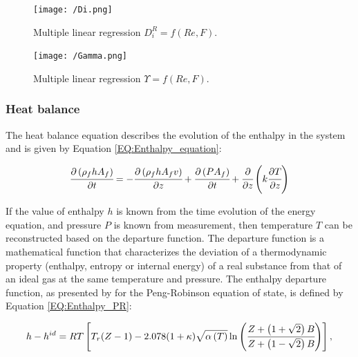 \documentclass[a4paper,fleqn]{cas-dc}
\begin{document}
	\begin{figure}[!ht]
		\centering
		\texttt{[image: /Di.png]}
		\caption{Multiple linear regression $D_i^R = f(Re, F).$}
		\label{fig:Correlation_Di}
	\end{figure}
	
	\begin{figure}[!ht]
		\centering
		\texttt{[image: /Gamma.png]}
		\caption{Multiple linear regression $\Upsilon = f(Re, F).$}
		\label{fig:Correlation_Gamma}
	\end{figure}
	
	\subsubsection{Heat balance} \label{CH: heat_balance}
	
	The heat balance equation describes the evolution of the enthalpy in the system and is given by Equation \ref{EQ:Enthalpy_equation}:
	
	{\footnotesize
		\begin{equation} \label{EQ:Enthalpy_equation}
			\cfrac{\partial \left(\rho_f {\color{black}h} A_f\right)}{\partial t} = - \cfrac{\partial \left( \rho_f {\color{black}h} A_f v \right)}{\partial z} + \cfrac{\partial \left(P A_f\right)}{\partial t} + \cfrac{\partial}{\partial z} \left( k \cfrac{\partial T}{\partial z} \right)
		\end{equation}
	}
	
	If the value of enthalpy $h$ is known from the time evolution of the energy equation, and pressure $P$ is known from measurement, then temperature $T$ can be reconstructed based on the departure function. The departure function is a mathematical function that characterizes the deviation of a thermodynamic property (enthalpy, entropy or internal energy) of a real substance from that of an ideal gas at the same temperature and pressure. The enthalpy departure function, as presented by \citet{Gmehling2019} for the Peng-Robinson equation of state,  is defined by Equation \ref{EQ:Enthalpy_PR}:
	
	{\scriptsize
		\begin{equation}
			{\color{black}h}-{\color{black}h}^{id}={\color{black}R}T \left[{\color{black}T_r}({\color{black}Z}-1) -2.078(1+{\color{black}\kappa} ){\sqrt { {\color{black}\alpha}\left(T\right) } } \ln \left(\cfrac{{\color{black}Z}+\left( 1+\sqrt{2} \right){\color{black}B}}{{\color{black}Z}+\left( 1-\sqrt{2} \right){\color{black}B}}\right)\right],
			\label{EQ:Enthalpy_PR}
		\end{equation}				
	}
	
\end{document}
